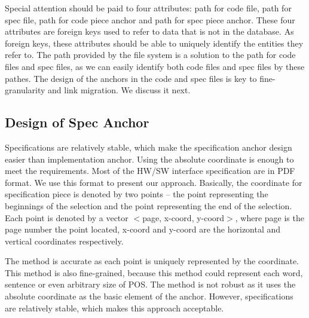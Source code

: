 Special attention should be paid to four attributes: path for code file, path for spec file, path for code piece anchor and path for spec piece anchor.
These four attributes are foreign keys used to refer to data that is not in the database.
As foreign keys, these attributes should be able to uniquely identify the entities they refer to.
The path provided by the file system is a solution to the path for code files and spec files, as we can easily identify both code files and spec files by these pathes.
The design of the anchors in the code and spec files is key to fine-granularity and link migration. We discuss it next.


%

\subsection{Design of Spec Anchor}

Specifications are relatively stable, which make the specification anchor design easier than implementation anchor. Using the absolute coordinate is enough to meet the requirements. Most of the HW/SW interface specification are in PDF format. We use this format to present our approach. Basically, the coordinate for specification piece is denoted by two points -- the point representing the beginnings of the selection and the point representing the end of the selection. Each point is denoted by a vector $<$page, x-coord, y-coord$>$, where page is the page number the point located, x-coord and y-coord are the horizontal and vertical coordinates respectively.

The method is accurate as each point is uniquely represented by the coordinate. This method is also fine-grained, because this method could represent each word, sentence or even arbitrary size of POS. The method is not robust as it uses the absolute coordinate as the basic element of the anchor. However, specifications are relatively stable, which makes this approach acceptable.


